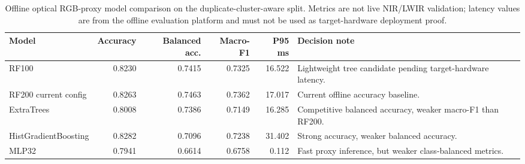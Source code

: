 \begin{table}[!htbp]
\centering
\small
\caption{Offline optical RGB-proxy model comparison on the duplicate-cluster-aware split. Metrics are not live NIR/LWIR validation; latency values are from the offline evaluation platform and must not be used as target-hardware deployment proof.}
\label{tab:ch6-ml-cluster-aware-models}
\begin{tabularx}{\textwidth}{@{}lrrrrX@{}}
\hline
\textbf{Model} & \textbf{Accuracy} & \textbf{Balanced acc.} & \textbf{Macro-F1} & \textbf{P95 ms} & \textbf{Decision note} \\
\hline
RF100 & 0.8230 & 0.7415 & 0.7325 & 16.522 & Lightweight tree candidate pending target-hardware latency. \\
RF200 current config & 0.8263 & 0.7463 & 0.7362 & 17.017 & Current offline accuracy baseline. \\
ExtraTrees & 0.8008 & 0.7386 & 0.7149 & 16.285 & Competitive balanced accuracy, weaker macro-F1 than RF200. \\
HistGradientBoosting & 0.8282 & 0.7096 & 0.7238 & 31.402 & Strong accuracy, weaker balanced accuracy. \\
MLP32 & 0.7941 & 0.6614 & 0.6758 & 0.112 & Fast proxy inference, but weaker class-balanced metrics. \\
\hline
\end{tabularx}
\end{table}
